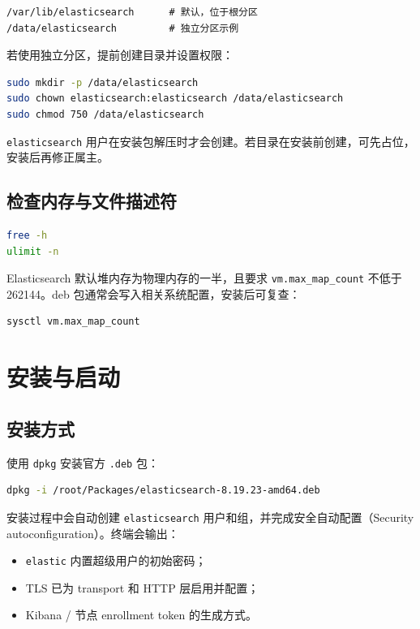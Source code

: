\documentclass[11pt,a4paper,openany]{ctexbook}
\begin{document}
\begin{lstlisting}
/var/lib/elasticsearch      # 默认，位于根分区
/data/elasticsearch         # 独立分区示例
\end{lstlisting}

若使用独立分区，提前创建目录并设置权限：

\begin{lstlisting}[language=bash]
sudo mkdir -p /data/elasticsearch
sudo chown elasticsearch:elasticsearch /data/elasticsearch
sudo chmod 750 /data/elasticsearch
\end{lstlisting}

\begin{note}
\texttt{elasticsearch} 用户在安装包解压时才会创建。若目录在安装前创建，可先占位，安装后再修正属主。
\end{note}

\section{检查内存与文件描述符}

\begin{lstlisting}[language=bash]
free -h
ulimit -n
\end{lstlisting}

Elasticsearch 默认堆内存为物理内存的一半，且要求 \texttt{vm.max\_map\_count} 不低于 262144。deb 包通常会写入相关系统配置，安装后可复查：

\begin{lstlisting}[language=bash]
sysctl vm.max_map_count
\end{lstlisting}

\chapter{安装与启动}

\section{安装方式}

使用 \texttt{dpkg} 安装官方 \texttt{.deb} 包：

\begin{lstlisting}[language=bash]
dpkg -i /root/Packages/elasticsearch-8.19.23-amd64.deb
\end{lstlisting}

安装过程中会自动创建 \texttt{elasticsearch} 用户和组，并完成安全自动配置（Security autoconfiguration）。终端会输出：

\begin{itemize}[leftmargin=1.4em]
  \item \texttt{elastic} 内置超级用户的初始密码；
  \item TLS 已为 transport 和 HTTP 层启用并配置；
  \item Kibana / 节点 enrollment token 的生成方式。
\end{itemize}
\end{document}
